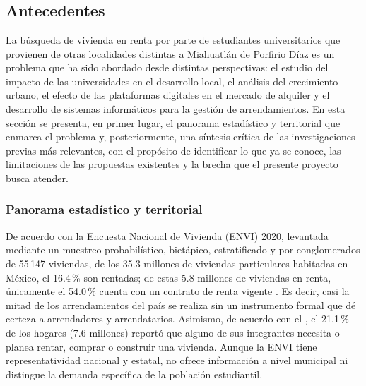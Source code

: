 \chapter[Protocolo de investigación]{}

\section{Antecedentes}

La búsqueda de vivienda en renta por parte de estudiantes universitarios que provienen de otras localidades distintas a Miahuatlán de Porfirio Díaz es un problema que ha sido abordado desde distintas perspectivas: el estudio del impacto de las universidades en el desarrollo local, el análisis del crecimiento urbano, el efecto de las plataformas digitales en el mercado de alquiler y el desarrollo de sistemas informáticos para la gestión de arrendamientos. En esta sección se presenta, en primer lugar, el panorama estadístico y territorial que enmarca el problema y, posteriormente, una síntesis crítica de las investigaciones previas más relevantes, con el propósito de identificar lo que ya se conoce, las limitaciones de las propuestas existentes y la brecha que el presente proyecto busca atender.

\subsection{Panorama estadístico y territorial}

De acuerdo con la Encuesta Nacional de Vivienda (ENVI) 2020, levantada mediante un muestreo probabilístico, bietápico, estratificado y por conglomerados de 55\,147 viviendas, de los 35.3 millones de viviendas particulares habitadas en México, el 16.4\,\% son rentadas; de estas 5.8 millones de viviendas en renta, únicamente el 54.0\,\% cuenta con un contrato de renta vigente \parencite{INEGI2021ENVI}. Es decir, casi la mitad de los arrendamientos del país se realiza sin un instrumento formal que dé certeza a arrendadores y arrendatarios. Asimismo, de acuerdo con el \textcite{INEGI2021ENVI}, el 21.1\,\% de los hogares (7.6 millones) reportó que alguno de sus integrantes necesita o planea rentar, comprar o construir una vivienda. Aunque la ENVI tiene representatividad nacional y estatal, no ofrece información a nivel municipal ni distingue la demanda específica de la población estudiantil.

